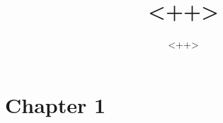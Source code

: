 \documentclass[12pt, twoside]{book}
\title{<++>}
\author{<++>}
\begin{document}
\maketitle
\chapter{Chapter 1}
\end{document}

